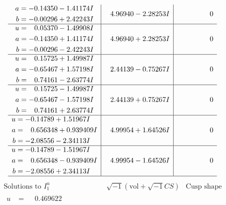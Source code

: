 \documentclass[1p]{elsarticle_modified}
\theoremstyle{definition}
\newcommand{\I}{\sqrt{-1}}
\begin{document}
$$\begin{array}{c|c|c}
\begin{aligned}
a &= -0.14350 - 1.41174 I \\
b &= -0.00296 + 2.42243 I\end{aligned}
 & \phantom{-}4.96940 - 2.28253 I & \phantom{-0.000000 } 0 \\ \hline\begin{aligned}
u &= \phantom{-}0.05370 - 1.49908 I \\
a &= -0.14350 + 1.41174 I \\
b &= -0.00296 - 2.42243 I\end{aligned}
 & \phantom{-}4.96940 + 2.28253 I & \phantom{-0.000000 } 0 \\ \hline\begin{aligned}
u &= \phantom{-}0.15725 + 1.49987 I \\
a &= -0.65467 + 1.57198 I \\
b &= \phantom{-}0.74161 - 2.63774 I\end{aligned}
 & \phantom{-}2.44139 - 0.75267 I & \phantom{-0.000000 } 0 \\ \hline\begin{aligned}
u &= \phantom{-}0.15725 - 1.49987 I \\
a &= -0.65467 - 1.57198 I \\
b &= \phantom{-}0.74161 + 2.63774 I\end{aligned}
 & \phantom{-}2.44139 + 0.75267 I & \phantom{-0.000000 } 0 \\ \hline\begin{aligned}
u &= -0.14789 + 1.51967 I \\
a &= \phantom{-}0.656348 + 0.939409 I \\
b &= -2.08556 - 2.34113 I\end{aligned}
 & \phantom{-}4.99954 + 1.64526 I & \phantom{-0.000000 } 0 \\ \hline\begin{aligned}
u &= -0.14789 - 1.51967 I \\
a &= \phantom{-}0.656348 - 0.939409 I \\
b &= -2.08556 + 2.34113 I\end{aligned}
 & \phantom{-}4.99954 - 1.64526 I & \phantom{-0.000000 } 0\\
 \hline 
 \end{array}$$\newpage$$\begin{array}{c|c|c}  
\text{Solutions to }I^u_{1}& \I (\text{vol} + \sqrt{-1}CS) & \text{Cusp shape}\\
 \hline 
\begin{aligned}
u &= \phantom{-}0.469622\phantom{ +0.000000I} \\

\end{aligned}
\end{array}$$
\end{document}
